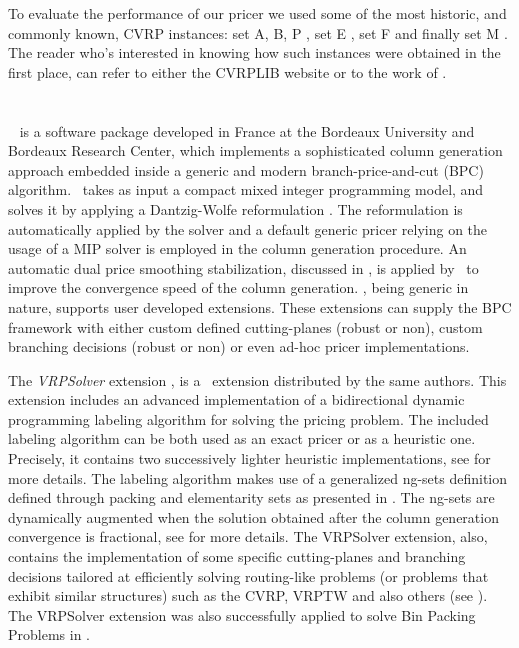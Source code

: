 \medskip

To evaluate the performance of our pricer we used some of the most historic,
and commonly known,
CVRP instances:
set A, B, P \parencite{augerat1995}, set E \parencite{christofides1969},
set F \parencite{fisher1994}
and finally set M \parencite{christofides1979}.
The reader who's interested in knowing how such instances were obtained in the first
place, can refer to either the CVRPLIB website or to the work of \textcite{uchoa2017}.

\medskip
{}

\section{\bapcod}
\label{sec:results-bapcod}

\textit{\bapcod}\ \parencite{sadykov2021} is a software package
developed in France at the Bordeaux University and Bordeaux Research Center,
which implements a sophisticated column generation approach
embedded inside a generic and modern branch-price-and-cut (BPC) algorithm.
\bapcod\ takes as input a compact mixed integer programming model,
and solves it by applying a Dantzig-Wolfe reformulation \parencite{dantzig1960}.
The reformulation is automatically applied by the solver
and a default generic pricer relying on
the usage of a MIP solver is employed in the column generation procedure.
An automatic dual price smoothing stabilization, discussed in \textcite{pessoa2018automation},
is applied by \bapcod\ to improve the convergence speed of the column generation.
\bapcod, being generic in nature,
supports user developed extensions.
These extensions can supply the BPC framework with either
custom defined cutting-planes (robust or non), custom branching decisions (robust or non)
or even ad-hoc pricer implementations.

The \textit{VRPSolver} extension \parencite{pessoa2020a}, is
a \bapcod\ extension distributed by the same authors.
This extension includes an
advanced implementation of a bidirectional dynamic programming labeling algorithm
\parencite{sadykov2021a} for solving the pricing problem.
The included labeling algorithm
can be both used as an exact pricer or as a heuristic one.
Precisely, it contains two successively lighter heuristic implementations, see \textcite{sadykov2021a} for more details.
The labeling algorithm makes use of a generalized ng-sets definition \parencite{baldacci2011}
defined through packing and elementarity sets as presented in \textcite{pessoa2020a}.
The ng-sets are dynamically augmented \parencite{roberti2014}
when the solution obtained after the column generation convergence
is fractional,
see \textcite{pessoa2020a} for more details.
The VRPSolver extension, also,
contains the implementation of some
specific cutting-planes and branching decisions
tailored at efficiently solving routing-like problems
(or problems that exhibit similar structures)
such as the CVRP, VRPTW and also others (see \cite{pessoa2020a}).
The VRPSolver extension was also successfully applied
to solve Bin Packing Problems in \textcite{pessoa2020}.

